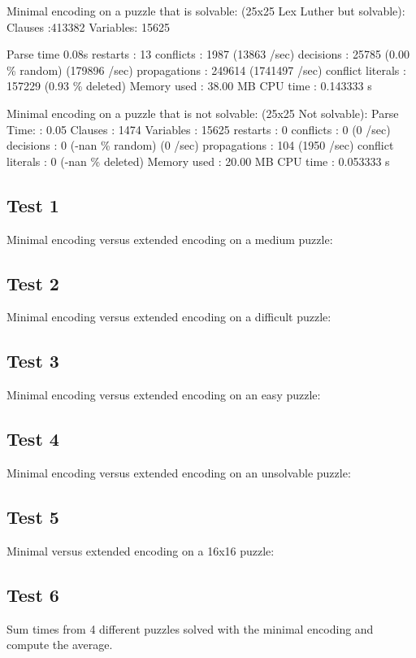 \documentclass[conference,draftclsnofoot]{IEEEtran}
\begin{document}
Minimal encoding on a puzzle that is solvable:
(25x25 Lex Luther but solvable):
Clauses  :413382
Variables: 15625

Parse time 0.08s
restarts              : 13
conflicts             : 1987           (13863 /sec)
decisions             : 25785          (0.00 \% random) (179896 /sec)
propagations          : 249614         (1741497 /sec)
conflict literals     : 157229         (0.93 \% deleted)
Memory used           : 38.00 MB
CPU time              : 0.143333 s

Minimal encoding on a puzzle that is not solvable:
(25x25 Not solvable):
Parse Time:		: 0.05
Clauses		      : 1474 
Variables	      : 15625
restarts              : 0
conflicts             : 0              (0 /sec)
decisions             : 0              (-nan \% random) (0 /sec)
propagations          : 104            (1950 /sec)
conflict literals     : 0              (-nan \% deleted)
Memory used           : 20.00 MB
CPU time              : 0.053333 s

\subsection{Test 1}
Minimal encoding versus extended encoding on a medium puzzle:

\subsection{Test 2}
Minimal encoding versus extended encoding on a difficult puzzle:


\subsection{Test 3}
Minimal encoding versus extended encoding on an easy puzzle:

\subsection{Test 4}
Minimal encoding versus extended encoding on an unsolvable puzzle:

\subsection{Test 5}
Minimal versus extended encoding on a 16x16 puzzle:

\subsection{Test 6}
Sum times from 4 different puzzles solved with the minimal encoding and compute
the average.
\end{document}
